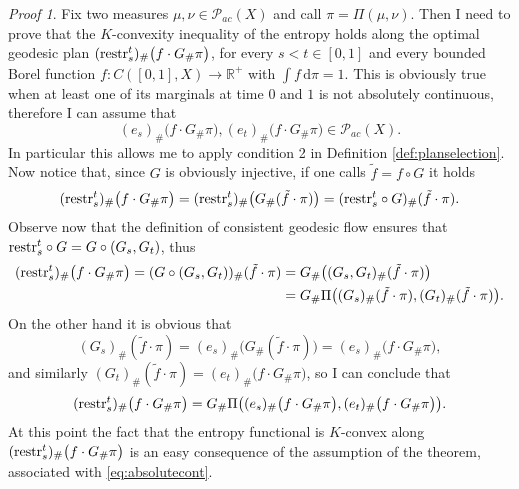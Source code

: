 \documentclass[11pt,twoside,a4paper]{article}
\newcommand{\R}{\mathbb{R}}
\newcommand{\de}{\ensuremath{\, \mathrm d}} %
\newcommand{\thmsymbol}{\( \square \)}
\newcommand{\rest}[2]{{{\rm restr}_{#1}^{#2}}}
\newcommand{\Prob}{\mathscr{P}}
\theoremstyle{theorem}
\theoremstyle{definition}
\theoremstyle{remark}
\theoremstyle{proof}
\newtheorem*{pro}{Proof}
\newenvironment{pr}{\begin{pro}%
 \renewcommand{\qedsymbol}{\thmsymbol}\pushQED{\qed}}%
 {\popQED\end{pro}}
\begin{document}
\begin{pr}
Fix two measures $\mu,\nu\in \Prob_{ac}(X)$ and call $\pi= \Pi(\mu,\nu)$. Then I need to prove that  the $K$-convexity inequality of the entropy holds along the optimal geodesic plan $(\rest{s}{t})_\# \big( f\cdot G_\#  \pi\big)$, for every $s<t \in [0,1]$ and every bounded Borel function $f:C([0,1],X)\to \R^+$ with $\int f \de \pi=1$. This is obviously true when at least one of its marginals at time $0$ and $1$ is not absolutely continuous, therefore I can assume that
\begin{equation}\label{eq:absolutecont}
    (e_s)_\# \big( f \cdot G_\# \pi\big), (e_t)_\# \big( f \cdot G_\# \pi\big) \in \Prob_{ac}(X).
\end{equation}
In particular this allows me to apply condition 2 in Definition \ref{def:planselection}. Now notice that, since $G$ is obviously injective, if one calls $\tilde f= f \circ G$ it holds
\begin{equation*}
    (\rest{s}{t})_\# \big( f\cdot G_\#  \pi\big) = (\rest{s}{t})_\# \big( G_\# (\tilde f \cdot \pi)\big) = (\rest{s}{t} \circ  G)_\# (\tilde f \cdot \pi).
\end{equation*}
Observe now that the definition of consistent geodesic flow ensures that $\rest{s}{t} \circ  G = G \circ (G_s,G_t)$, thus  
\begin{align*}
    (\rest{s}{t})_\# \big( f\cdot G_\#  \pi\big) = (G \circ (G_s,G_t))_\# (\tilde f\cdot \pi)&= G_\# \big( (G_s,G_t)_\# (\tilde f \cdot \pi)\big) \\
    &= G_\# \Pi\big( (G_s)_\# (\tilde f \cdot \pi), (G_t)_\# (\tilde f \cdot \pi)\big) .
\end{align*}
On the other hand it is obvious that 
\begin{equation*}
    (G_s)_\# (\tilde f \cdot \pi) = (e_s)_\# \big( G_\# (\tilde f \cdot \pi) \big) = (e_s)_\# \big( f \cdot G_\# \pi\big),
\end{equation*}
and similarly $(G_t)_\# (\tilde f \cdot \pi) = (e_t)_\# \big( f \cdot G_\# \pi\big)$, so I can conclude that
\begin{equation*}
    (\rest{s}{t})_\# \big( f\cdot G_\#  \pi\big) = G_\# \Pi\big((e_s)_\# \big( f \cdot G_\# \pi\big), (e_t)_\# \big( f \cdot G_\# \pi\big) \big).
\end{equation*}
At this point the fact that the entropy functional is $K$-convex along $(\rest{s}{t})_\# \big( f\cdot G_\#  \pi\big)$ is an easy consequence of the assumption of the theorem, associated with \eqref{eq:absolutecont}.
\end{pr}
\end{document}

